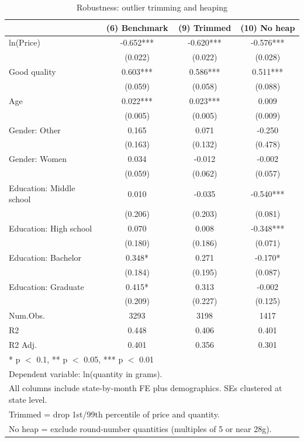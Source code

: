 \begin{table}[H]
\centering
\caption{Robustness: outlier trimming and heaping}
\label{tab:robustness}
\centering
\begin{tabular}[t]{lccc}
\toprule
  & (6) Benchmark & (9) Trimmed & (10) No heap\\
\midrule
ln(Price) & -0.652*** & -0.620*** & -0.576***\\
 & (0.022) & (0.022) & (0.028)\\
Good quality & 0.603*** & 0.586*** & 0.511***\\
 & (0.059) & (0.058) & (0.088)\\
Age & 0.022*** & 0.023*** & 0.009\\
 & (0.005) & (0.005) & (0.009)\\
Gender: Other & 0.165 & 0.071 & -0.250\\
 & (0.163) & (0.132) & (0.478)\\
Gender: Women & 0.034 & -0.012 & -0.002\\
 & (0.059) & (0.062) & (0.057)\\
Education: Middle school & 0.010 & -0.035 & -0.540***\\
 & (0.206) & (0.203) & (0.081)\\
Education: High school & 0.070 & 0.008 & -0.348***\\
 & (0.180) & (0.186) & (0.071)\\
Education: Bachelor & 0.348* & 0.271 & -0.170*\\
 & (0.184) & (0.195) & (0.087)\\
Education: Graduate & 0.415* & 0.313 & -0.002\\
 & (0.209) & (0.227) & (0.125)\\
\midrule
Num.Obs. & 3293 & 3198 & 1417\\
R2 & 0.448 & 0.406 & 0.401\\
R2 Adj. & 0.401 & 0.356 & 0.301\\
\bottomrule
\multicolumn{4}{l}{\rule{0pt}{1em}* p $<$ 0.1, ** p $<$ 0.05, *** p $<$ 0.01}\\
\multicolumn{4}{l}{\rule{0pt}{1em}Dependent variable: ln(quantity in grams).}\\
\multicolumn{4}{l}{\rule{0pt}{1em}All columns include state-by-month FE plus demographics. SEs clustered at state level.}\\
\multicolumn{4}{l}{\rule{0pt}{1em}Trimmed = drop 1st/99th percentile of price and quantity.}\\
\multicolumn{4}{l}{\rule{0pt}{1em}No heap = exclude round-number quantities (multiples of 5 or near 28g).}\\
\end{tabular}
\end{table}
